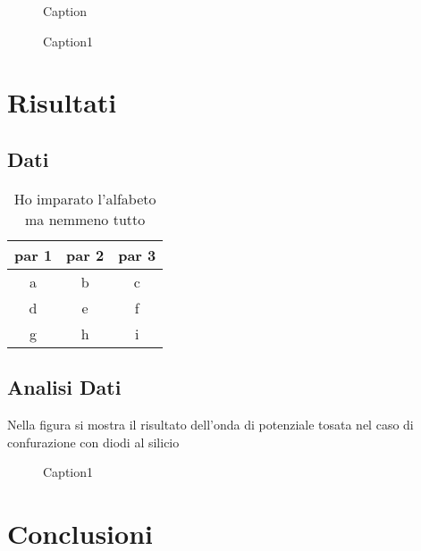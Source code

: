 \documentclass[a4paper,11pt]{article}
\begin{document}
\begin{figure}
    \centering
    \caption{Caption}
    \label{fig:circuito}
\end{figure}

\begin{figure}
    \centering
    \caption{Caption1}
    \label{fig:apparato}
\end{figure}


\section{Risultati}



\subsection{Dati}


\begin{table}[h!]
\centering
\begin{tabular}{|c|c|c|}
\hline
\textbf{par 1} & \textbf{par 2} & \textbf{par 3} \\
\hline
a & b & c \\
\hline
d & e & f \\
\hline
g & h & i \\
\hline
\end{tabular}
\caption{Ho imparato l'alfabeto ma nemmeno tutto}
\label{}
\end{table}


\subsection{Analisi Dati} 
Nella figura si mostra il risultato dell'onda di potenziale tosata nel caso di confurazione con diodi al silicio

\begin{figure}
	\centering
	\caption{Caption1}
	\label{fig:apparato}
\end{figure}



\section{Conclusioni}



\medskip

\printbibliography
\end{document}
